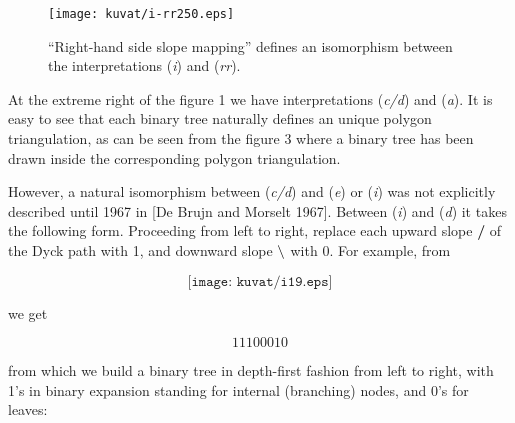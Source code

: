 \documentclass[11pt]{article} %
\newcommand{\catint}[1]{({\it #1})}
\begin{document}
\begin{figure}[hbtp]
\texttt{[image: kuvat/i-rr250.eps]}
\caption{``Right-hand side slope mapping'' defines an isomorphism
  between the interpretations \catint{i} and \catint{rr}.}
\end{figure}

At the extreme right of the figure 1 we have interpretations \catint{c/d}
and \catint{a}. It is easy to see that each binary tree naturally defines
an unique polygon triangulation, as can be seen from the figure 3
where a binary tree has been drawn inside the corresponding polygon
triangulation.

However, a natural isomorphism between \catint{c/d} and \catint{e} or \catint{i} was not
explicitly described until 1967 in [De Brujn and Morselt 1967]. Between \catint{i} and
\catint{d} it takes the following form. Proceeding from left to right,
replace each upward slope {\bf /} of the Dyck path with 1, and downward
slope {\ensuremath {\bf{\backslash}}} with 0. For example, from

$$
\texttt{[image: kuvat/i19.eps]}
$$

we get

$$
11100010
$$

from which we build a binary tree in depth-first fashion from left to
right, with 1's in binary expansion standing for internal (branching)
nodes, and 0's for leaves:

\end{document}
